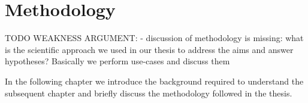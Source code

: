 \chapter{Methodology}
\label{ch:methodology}

TODO WEAKNESS ARGUMENT:
- discussion of methodology is missing: what is the scientific approach we used in our thesis to address the aims and answer hypotheses? Basically we perform use-cases and discuss them

In the following chapter we introduce the background required to understand the subsequent chapter and briefly discuss the methodology followed in the thesis.




